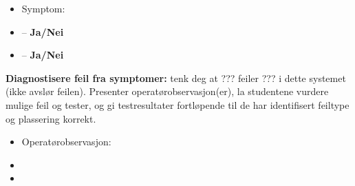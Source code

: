\begin{itemize}
\item{} Symptom: {\it }
\item{}  -- {\bf Ja/Nei}
\item{}  -- {\bf Ja/Nei}
\end{itemize}

\vskip 10pt

\noindent
{\bf Diagnostisere feil fra symptomer:} tenk deg at ??? feiler ??? i dette systemet (ikke avslør feilen). Presenter operatørobservasjon(er), la studentene vurdere mulige feil og tester, og gi testresultater fortløpende til de har identifisert feiltype og plassering korrekt.

\begin{itemize}
\item{} Operatørobservasjon: {\it }
\item{}
\item{}
\end{itemize}


